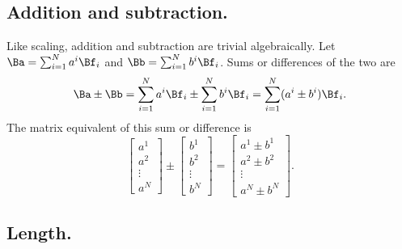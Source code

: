 \subsection{Addition and subtraction.}
Like scaling, addition and subtraction are trivial algebraically.  Let
\( \Ba = \sum_{i = 1}^N a^i \Bf_i \) and
\( \Bb = \sum_{i = 1}^N b^i \Bf_i \).  Sums or differences of the two are
\begin{equation}\label{eqn:multivector:280}
\Ba \pm \Bb =
\sum_{i = 1}^N a^i \Bf_i
\pm
\sum_{i = 1}^N b^i \Bf_i
=
\sum_{i = 1}^N (a^i \pm b^i) \Bf_i.
\end{equation}
The matrix equivalent of this sum or difference is
\begin{equation}\label{eqn:multivector:300}
\begin{bmatrix}
a^1 \\
a^2 \\
\vdots \\
a^N
\end{bmatrix}
\pm
\begin{bmatrix}
b^1 \\
b^2 \\
\vdots \\
b^N
\end{bmatrix}
=
\begin{bmatrix}
a^1 \pm b^1 \\
a^2 \pm b^2 \\
\vdots \\
a^N \pm b^N
\end{bmatrix}.
\end{equation}
\subsection{Length.}
